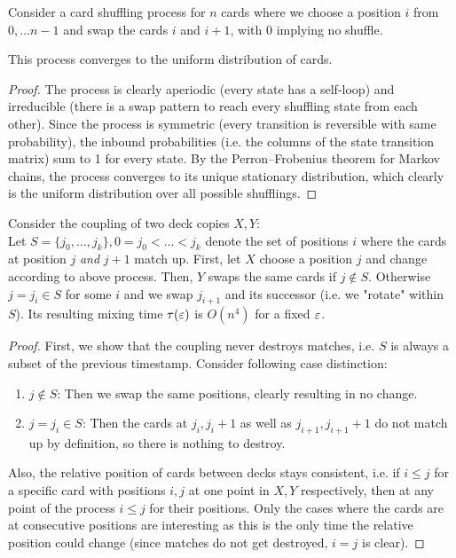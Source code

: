 \begin{aufgabe}
Consider a card shuffling process for $n$ cards where we choose a position $i$ from $0, \dots n-1$ and swap the cards $i$ and $i+1$, with $0$ implying no shuffle.

This process converges to the uniform distribution of cards.
\begin{proof}
    The process is clearly aperiodic (every state has a self-loop) and irreducible (there is a swap pattern to reach every shuffling state from each other).
    Since the process is symmetric (every transition is reversible with same probability), the inbound probabilities (i.e. the columns of the state transition matrix) sum to 1 for every state.
    By the Perron–Frobenius theorem for Markov chains, the process converges to its unique stationary distribution, which clearly is the uniform distribution over all possible shufflings.
\end{proof}
Consider the coupling of two deck copies $X,Y$:\\
Let $S = \{j_0, \dots, j_k\}, 0 = j_0 < \dots < j_k$ 
denote the set of positions $i$ where the cards at position $j$ \emph{and} $j+1$ match up.
First, let $X$ choose a position $j$ and change according to above process.
Then, $Y$ swaps the same cards if $j \not \in S$. 
Otherwise $j = j_i \in S$ for some $i$ and we swap $j_{i+1}$ and its successor (i.e. we "rotate" within $S$).
Its resulting mixing time $\tau(\varepsilon)$ is $O(n^4)$ for a fixed $\varepsilon$.
\begin{proof}
    First, we show that the coupling never destroys matches, i.e. $S$ is always a subset of the previous timestamp.
    Consider following case distinction:
    \begin{enumerate}
        \item $j \not \in S$: Then we swap the same positions, clearly resulting in no change.
        \item $j = j_i \in S$: Then the cards at $j_i, j_i+1$ as well as $j_{i+1}, j_{i+1}+1$ do not match up by definition, so there is nothing to destroy.
    \end{enumerate}
    Also, the relative position of cards between decks stays consistent, i.e. if $i \leq j$ for a specific card with positions $i,j$ at one point in $X,Y$ respectively, then at any point of the process $i \leq j$ for their positions.
    Only the cases where the cards are at consecutive positions are interesting as this is the only time the relative position could change (since matches do not get destroyed, $i=j$ is clear).

\end{proof}
\end{aufgabe}
